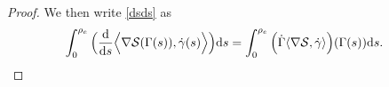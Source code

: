 \documentclass[11pt,UTF-8,reqno]{amsart}
\numberwithin{equation}{section}
\def\<{{\langle}}
\def\>{{\rangle}}
\def\dif{{\mathord{{\rm d}}}}
\def\cS{{\mathcal S}}
\def\<{{\langle}}
\def\>{{\rangle}}
\def\dif{{\mathord{{\rm d}}}}
\def\<{\langle} \def\>{\rangle}
\begin{document}
\begin{proof}
We then write  \eqref{dsds} as
\begin{align*}
	\int_0^{\rho_e}\Big(\frac{\dif}{\dif s} \Big\<\nabla \cS(\Gamma(s)),\dot \gamma(s)\Big\>\Big)\dif s
	&=\int_0^{\rho_e} \Big( \dot\Gamma\<\nabla \cS,\dot \gamma\> \Big) (\Gamma(s))\dif s.
\end{align*}




\end{proof}
\end{document}
